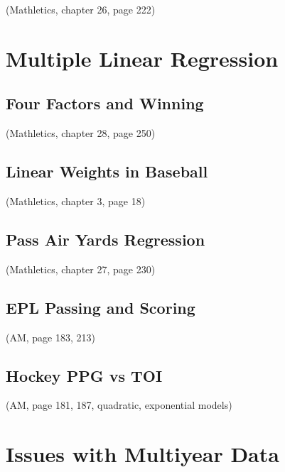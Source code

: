 \documentclass[
  11pt,
]{book}
\theoremstyle{definition}
\theoremstyle{definition}
\theoremstyle{definition}
\theoremstyle{definition}
\theoremstyle{remark}
\begin{document}
(Mathletics, chapter 26, page 222)

\hypertarget{multiple-linear-regression}{%
\section{Multiple Linear Regression}\label{multiple-linear-regression}}

\hypertarget{four-factors-and-winning}{%
\subsection{Four Factors and Winning}\label{four-factors-and-winning}}

(Mathletics, chapter 28, page 250)

\hypertarget{linear-weights-in-baseball}{%
\subsection{Linear Weights in Baseball}\label{linear-weights-in-baseball}}

(Mathletics, chapter 3, page 18)

\hypertarget{pass-air-yards-regression}{%
\subsection{Pass Air Yards Regression}\label{pass-air-yards-regression}}

(Mathletics, chapter 27, page 230)

\hypertarget{epl-passing-and-scoring}{%
\subsection{EPL Passing and Scoring}\label{epl-passing-and-scoring}}

(AM, page 183, 213)

\hypertarget{hockey-ppg-vs-toi}{%
\subsection{Hockey PPG vs TOI}\label{hockey-ppg-vs-toi}}

(AM, page 181, 187, quadratic, exponential models)

\hypertarget{issues-with-multiyear-data}{%
\section{Issues with Multiyear Data}\label{issues-with-multiyear-data}}
\end{document}
